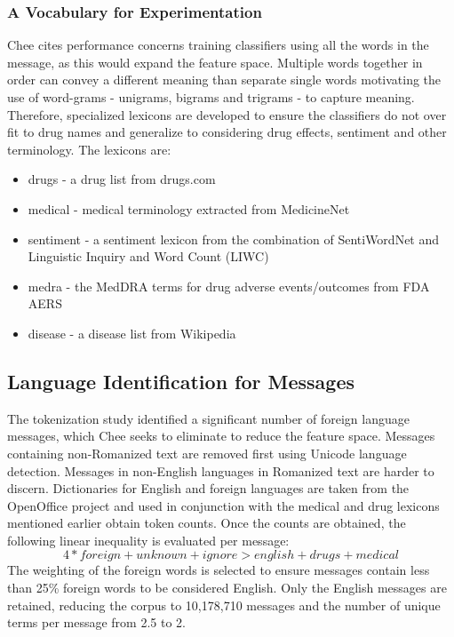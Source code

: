 \documentclass[twoside,11pt]{article}
\begin{document}
\subsubsection{A Vocabulary for Experimentation}
Chee cites performance concerns training classifiers using all the words in the message, as this would expand the feature space. Multiple words together in order can convey a different meaning than separate single words motivating the use of word-grams - unigrams, bigrams and trigrams - to capture meaning. Therefore, specialized lexicons are developed to ensure the classifiers do not over fit to drug names and generalize to considering drug effects, sentiment and other terminology. The lexicons are:
\begin{itemize}
  \item drugs - a drug list from drugs.com
  \item medical - medical terminology extracted from MedicineNet
  \item sentiment - a sentiment lexicon from the combination of SentiWordNet and Linguistic Inquiry and Word Count (LIWC)
  \item medra - the MedDRA terms for drug adverse events/outcomes from FDA AERS
  \item disease - a disease list from Wikipedia
\end{itemize}

\subsection{Language Identification for Messages}
The tokenization study identified a significant number of foreign language messages, which Chee seeks to eliminate to reduce the feature space. Messages containing non-Romanized text are removed first using Unicode language detection. Messages in non-English languages in Romanized text are harder to discern. Dictionaries for English and foreign languages are taken from the OpenOffice project and used in conjunction with the medical and drug lexicons mentioned earlier obtain token counts. Once the counts are obtained, the following linear inequality is evaluated per message:
\[
  4 * foreign + unknown + ignore > english + drugs + medical
\]
The weighting of the foreign words is selected to ensure messages contain less than 25\% foreign words to be considered English. Only the English messages are retained, reducing the corpus to 10,178,710 messages and the number of unique terms per message from 2.5 to 2. %
\end{document}
